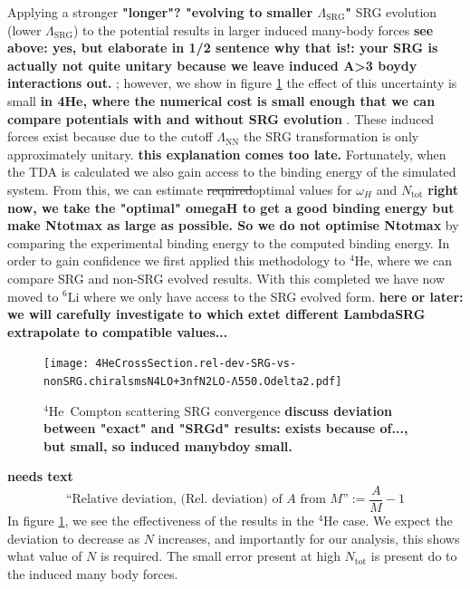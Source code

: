 \documentclass[a4paper,11pt]{article}
\newcommand{\Ntot}{N_{\mathrm{tot}}}
\newcommand{\LamSRG}{\Lambda_{\mathrm{SRG}}}
\newcommand{\LamNN}{\Lambda_{\mathrm{NN}}}
\newcommand{\LiS}{{}^{6} \mathrm{Li} }
\newcommand{\HeF}{{}^{4} \mathrm{He}}
\newcommand{\com}[1]{\color{blue}\small\textbf{ #1 }\color{black}\normalsize}
\newcommand{\replace}[2]{\sout{\protect#1}\color{blue}#2\color{black}}
\begin{document}
Applying a stronger\com{"longer"?  "evolving to smaller $\LamSRG$"}
SRG evolution (lower $\LamSRG$) to the potential results in larger
induced many-body forces \com{see above: yes, but elaborate in 1/2 sentence why that is!: your SRG is actually not quite unitary because we leave induced A>3 boydy interactions out.}; however, we show in figure \ref{fig:SRGConverge4He} the
effect of this uncertainty is small \com{in 4He, where the numerical cost is small enough that we can compare potentials with and without SRG evolution}.
These induced forces exist because due to the cutoff $\LamNN$ the SRG transformation
is only approximately unitary. \com{this explanation comes too late.}
Fortunately, when the TDA is calculated we also gain access to the
binding energy of the simulated system.
From this, we can estimate \replace{required}{optimal} values for $\omega_H$ and
$\Ntot$ \com{right now, we take the "optimal" omegaH to get a good binding energy but make Ntotmax as large as possible. So we do not optimise Ntotmax} by comparing the experimental binding energy to the computed
binding energy.
In order to gain confidence we first applied this methodology 
to $\HeF$, where we can compare SRG and non-SRG evolved results. 
With this completed we have now moved to $\LiS$ where we only have access to 
the SRG evolved form. \com{here or later: we will carefully investigate to which extet different LambdaSRG extrapolate to compatible values...}
\begin{figure}[H]
  \begin{center}
    \texttt{[image: 
    4HeCrossSection.rel-dev-SRG-vs-nonSRG.chiralsmsN4LO+3nfN2LO-Λ550.Odelta2.pdf]}
    \caption{$\HeF$\, Compton scattering SRG convergence \com{discuss deviation between "exact" and "SRGd" results: exists because of..., but small, so induced manybdoy small.}}
    \label{fig:SRGConverge4He}
  \end{center}
\end{figure}

\com{needs text}
\begin{equation}
  \text{``Relative deviation, (Rel. deviation) of $A$ from $M$''}:=
  \frac{A}{M}-1
\end{equation}
In figure \ref{fig:SRGConverge4He}, we see the effectiveness of the
results in the $\HeF$ case.
We expect the deviation to decrease as $N$ increases, and importantly
for our analysis, this shows what value of $N$ is required.
The small error present at high $\Ntot$ is present do to the induced many body forces.
\end{document}
